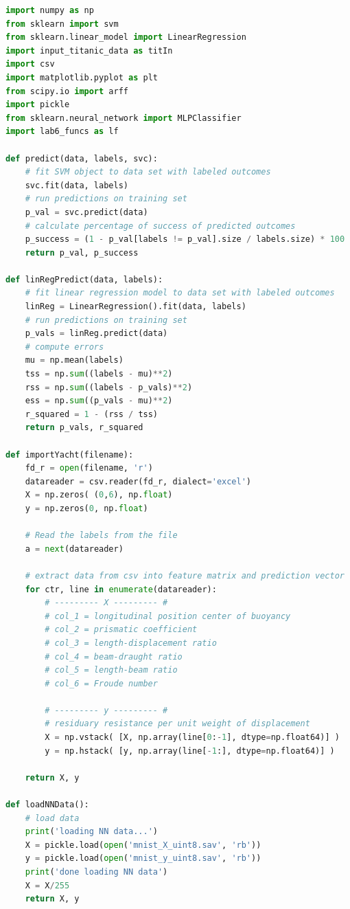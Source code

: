 \documentclass[11pt,a4paper]{article}
\begin{document}
\begin{lstlisting}[language=Python]
import numpy as np
from sklearn import svm
from sklearn.linear_model import LinearRegression
import input_titanic_data as titIn
import csv
import matplotlib.pyplot as plt
from scipy.io import arff
import pickle
from sklearn.neural_network import MLPClassifier
import lab6_funcs as lf

def predict(data, labels, svc):
    # fit SVM object to data set with labeled outcomes
    svc.fit(data, labels)
    # run predictions on training set
    p_val = svc.predict(data)
    # calculate percentage of success of predicted outcomes
    p_success = (1 - p_val[labels != p_val].size / labels.size) * 100
    return p_val, p_success

def linRegPredict(data, labels):
    # fit linear regression model to data set with labeled outcomes
    linReg = LinearRegression().fit(data, labels)
    # run predictions on training set
    p_vals = linReg.predict(data)
    # compute errors
    mu = np.mean(labels)
    tss = np.sum((labels - mu)**2)
    rss = np.sum((labels - p_vals)**2)
    ess = np.sum((p_vals - mu)**2)
    r_squared = 1 - (rss / tss)
    return p_vals, r_squared

def importYacht(filename):
    fd_r = open(filename, 'r')
    datareader = csv.reader(fd_r, dialect='excel')
    X = np.zeros( (0,6), np.float)
    y = np.zeros(0, np.float)

    # Read the labels from the file
    a = next(datareader)

    # extract data from csv into feature matrix and prediction vector
    for ctr, line in enumerate(datareader):
        # --------- X --------- #
        # col_1 = longitudinal position center of buoyancy
        # col_2 = prismatic coefficient
        # col_3 = length-displacement ratio
        # col_4 = beam-draught ratio
        # col_5 = length-beam ratio
        # col_6 = Froude number

        # --------- y --------- #
        # residuary resistance per unit weight of displacement
        X = np.vstack( [X, np.array(line[0:-1], dtype=np.float64)] )
        y = np.hstack( [y, np.array(line[-1:], dtype=np.float64)] )

    return X, y

def loadNNData():
    # load data
    print('loading NN data...')
    X = pickle.load(open('mnist_X_uint8.sav', 'rb'))
    y = pickle.load(open('mnist_y_uint8.sav', 'rb'))
    print('done loading NN data')
    X = X/255
    return X, y


\end{lstlisting}
\end{document}
